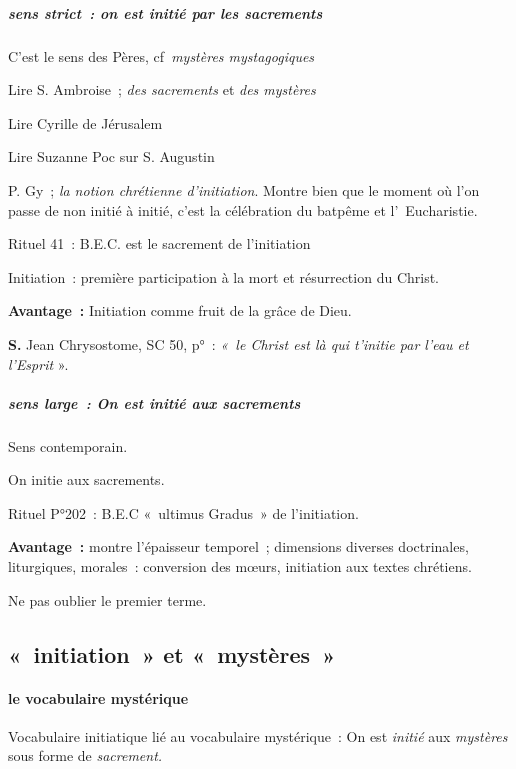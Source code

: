 \hypertarget{sens-strict-on-est-initiuxe9-par-les-sacrements}{%
\subparagraph{sens strict~: on est initié par les
sacrements}\label{sens-strict-on-est-initiuxe9-par-les-sacrements}}

C'est le sens des Pères, cf~\emph{mystères mystagogiques}

Lire S. Ambroise~; \emph{des sacrements} et \emph{des mystères}

Lire Cyrille de Jérusalem

Lire Suzanne Poc sur S. Augustin

P. Gy~; \emph{la notion chrétienne d'initiation}. Montre bien que le
moment où l'on passe de non initié à initié, c'est la célébration du
batpême et l'~Eucharistie.

Rituel 41~: B.E.C. est le sacrement de l'initiation

Initiation~: première participation à la mort et résurrection du Christ.

\textbf{Avantage~:} Initiation comme fruit de la grâce de Dieu.

\textbf{S.} Jean Chrysostome, SC 50, p°~: \emph{«~le Christ est là qui
t'initie par l'eau et l'Esprit} ».

\hypertarget{sens-large-on-est-initiuxe9-aux-sacrements}{%
\subparagraph{sens large~: On est initié aux
sacrements}\label{sens-large-on-est-initiuxe9-aux-sacrements}}

Sens contemporain.

On initie aux sacrements.

Rituel P°202~: B.E.C «~ultimus Gradus~» de l'initiation.

\textbf{Avantage~:} montre l'épaisseur temporel~; dimensions diverses
doctrinales, liturgiques, morales~: conversion des mœurs, initiation aux
textes chrétiens.

Ne pas oublier le premier terme.

\hypertarget{initiation-et-mystuxe8res}{%
\subsection{«~initiation~» et
«~mystères~»}\label{initiation-et-mystuxe8res}}

\hypertarget{le-vocabulaire-mystuxe9rique}{%
\paragraph{le vocabulaire
mystérique}\label{le-vocabulaire-mystuxe9rique}}

Vocabulaire initiatique lié au vocabulaire mystérique~: On est
\emph{initié} aux \emph{mystères} sous forme de \emph{sacrement.}

